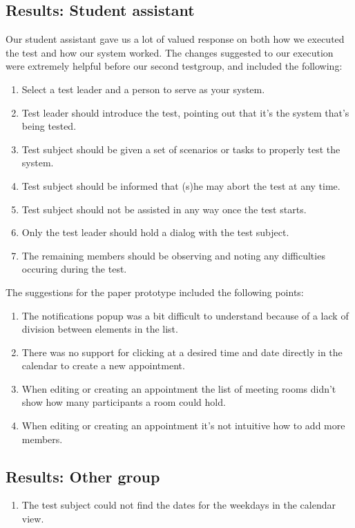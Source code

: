 \subsection{Results: Student assistant}
Our student assistant gave us a lot of valued response on both how we executed the test and how our system worked. The changes suggested to our execution were extremely helpful before our second testgroup, and included the following:
\begin{enumerate}
\item Select a test leader and a person to serve as your system.
\item Test leader should introduce the test, pointing out that it's the system that's being tested. 
\item Test subject should be given a set of scenarios or tasks to properly test the system. 
\item Test subject should be informed that (s)he may abort the test at any time.
\item Test subject should not be assisted in any way once the test starts.
\item Only the test leader should hold a dialog with the test subject.
\item The remaining members should be observing and noting any difficulties occuring during the test.
\end{enumerate}

The suggestions for the paper prototype included the following points:
\begin{enumerate}
\item The notifications popup was a bit difficult to understand because of a lack of division between elements in the list.
\item There was no support for clicking at a desired time and date directly in the calendar to create a new appointment.
\item When editing or creating an appointment the list of meeting rooms didn't show how many participants a room could hold.
\item When editing or creating an appointment it's not intuitive how to add more members.
\end{enumerate}

\subsection{Results: Other group}
\begin{enumerate}
\item The test subject could not find the dates for the weekdays in the calendar view.
\end{enumerate}